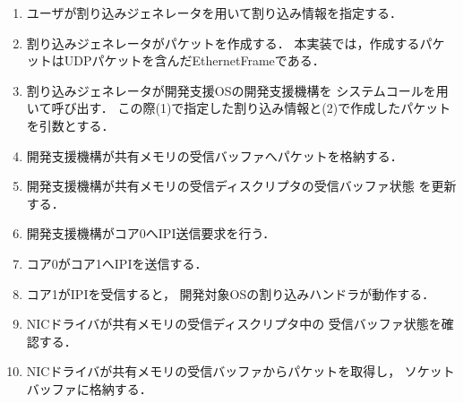 \documentclass[submit,techreq,noauthor,dvipdfmx]{ipsj}
\begin{document}
\begin{enumerate}
    \item
        ユーザが割り込みジェネレータを用いて割り込み情報を指定する．
    \item 
        割り込みジェネレータがパケットを作成する．
        本実装では，作成するパケットはUDPパケットを含んだEthernetFrameである．
    \item 
        割り込みジェネレータが開発支援OSの開発支援機構を
        システムコールを用いて呼び出す．
        この際(1)で指定した割り込み情報と(2)で作成したパケットを引数とする．
    \item 
        開発支援機構が共有メモリの受信バッファへパケットを格納する．
    \item 
        開発支援機構が共有メモリの受信ディスクリプタの受信バッファ状態
        を更新する．
    \item
        開発支援機構がコア0へIPI送信要求を行う．
    \item
        コア0がコア1へIPIを送信する．
    \item 
        コア1がIPIを受信すると，
        開発対象OSの割り込みハンドラが動作する．
    \item 
        NICドライバが共有メモリの受信ディスクリプタ中の
        受信バッファ状態を確認する．
    \item 
        NICドライバが共有メモリの受信バッファからパケットを取得し，
        ソケットバッファに格納する．
\end{enumerate}
%
%
%
%
\end{document}
